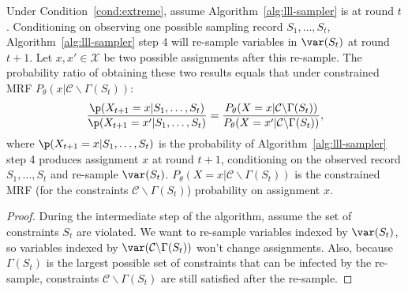 \begin{lemma} \label{lem:ratio-prob}
Under Condition~\ref{cond:extreme}, assume Algorithm~\ref{alg:lll-sampler} is at round $t$. Conditioning on observing one possible sampling record $S_1,\ldots,S_t$, Algorithm~\ref{alg:lll-sampler} step 4 will re-sample variables in $\var(S_t)$ at round $t+1$. Let $x,x'\in\mathcal{X}$ be two possible assignments after this re-sample.  The probability ratio  of obtaining these two results equals that under constrained MRF
$P_{\theta}(x|\mathcal{C}\backslash \Gamma(S_t))$:
\begin{equation} \label{eq:ratio}
\frac{\p(X_{t+1}= x |S_1,\ldots, S_t)}{\p(X_{t+1}= x'|S_1,\ldots, S_t)} = \frac{P_{\theta}(X = x |\mathcal{C}\backslash \Gamma(S_t))}{P_{\theta}(X = x'|\mathcal{C}\backslash \Gamma(S_t))},
\end{equation} 
where $\p(X_{t+1}= x |S_1,\ldots, S_t)$ is the probability of Algorithm~\ref{alg:lll-sampler} step 4 produces assignment $x$ at round $t+1$, conditioning on the observed record $S_1,\ldots, S_t$ and re-sample $\var(S_t)$. $P_{\theta}(X = x |\mathcal{C}\backslash \Gamma(S_t))$ is the constrained MRF (for the constraints  $\mathcal{C}\backslash \Gamma(S_t)$) probability on assignment $x$.
\begin{proof}
During the intermediate step of the algorithm, assume the set of constraints $S_t$ are violated. We want to re-sample variables indexed by $\var(S_t)$, so  variables indexed by $\var(\mathcal{C}\backslash\Gamma(S_t))$ won't change assignments. Also, because $\Gamma(S_t)$ is the largest possible set of constraints that can be infected by the re-sample, constraints $\mathcal{C}\backslash \Gamma(S_t)$ are still satisfied after the re-sample. 


\end{proof}
\end{lemma}
